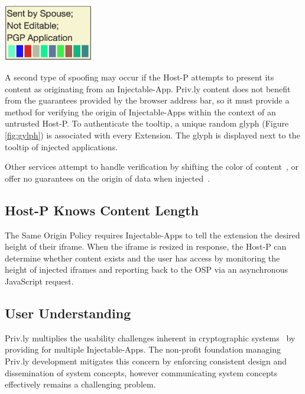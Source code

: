 \documentclass[letterpaper,twocolumn,10pt]{article}
\begin{document}
\begin{center}
  \includegraphics[height=25mm]{graphics/glyph.eps}
  \label{fig:gylph}
\end{center}

A second type of spoofing may occur if the Host-P attempts to present its content 
as originating from an Injectable-App. Priv.ly content does not benefit from the 
guarantees provided by the browser address bar, so it must provide a method for 
verifying the origin of Injectable-Apps within the context of an untrusted Host-P. 
To authenticate the tooltip, a unique random glyph (Figure \ref{fig:gylph}) is associated with every 
Extension. The glyph is displayed next to the tooltip of injected applications.

Other services attempt to handle verification by shifting the color of 
content~\cite{Fahl2012b}, or offer no guarantees on the origin of data when 
injected~\cite{Beato2011}.

\subsection{Host-P Knows Content Length}

The Same Origin Policy requires Injectable-Apps to tell the extension the desired 
height of their iframe. When the iframe is resized in response, the Host-P can 
determine whether content exists and the user has access by monitoring the height 
of injected iframes and reporting back to the OSP via an asynchronous JavaScript request.

\subsection{User Understanding}

Priv.ly multiplies the usability challenges inherent in cryptographic 
systems~\cite{Whitten1999,Fahl2012} by providing for multiple Injectable-Apps. The non-profit foundation managing Priv.ly development mitigates this concern by enforcing 
consistent design and dissemination of system concepts, however communicating 
system concepts effectively remains a challenging problem.
\end{document}
